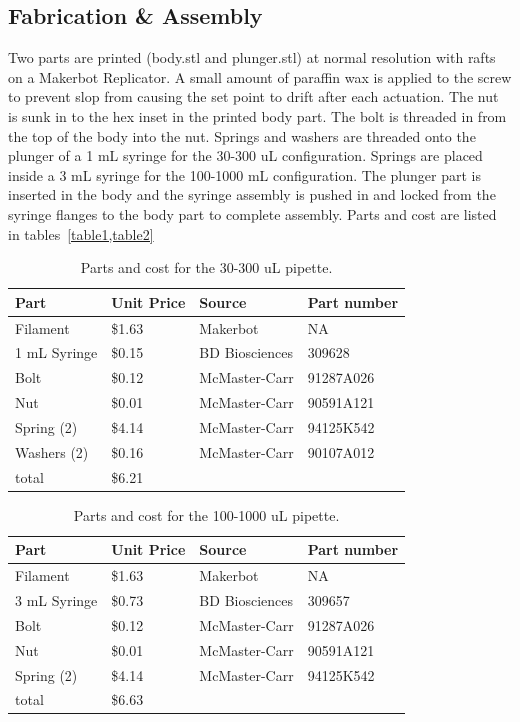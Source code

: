 \documentclass[10pt,letterpaper]{article}
\begin{document}
\subsection*{Fabrication & Assembly}
Two parts are printed (body.stl and plunger.stl) at normal resolution with rafts on a Makerbot Replicator.
A small amount of paraffin wax is applied to the screw to prevent slop from causing the set point to drift after each actuation.
The nut is sunk in to the hex inset in the printed body part.
The bolt is threaded in from the top of the body into the nut.
Springs and washers are threaded onto the plunger of a 1 mL syringe for the 30-300 uL configuration.
Springs are placed inside a 3 mL syringe for the 100-1000 mL configuration.
The plunger part is inserted in the body and the syringe assembly is pushed in and locked from the syringe flanges to the body part to complete assembly.
Parts and cost are listed in tables~\ref{table1,table2}

\begin{table}[!ht]
\centering
\caption{Parts and cost for the 30-300 uL pipette.}
\label{table1}
\begin{tabular}{|l|l|l|l|}
	\hline
	Part         & Unit Price & Source         & Part number \\ \hline
	Filament     & \$1.63     & Makerbot       & NA          \\ \hline
	1 mL Syringe & \$0.15     & BD Biosciences & 309628      \\ \hline
	Bolt         & \$0.12     & McMaster-Carr  & 91287A026   \\ \hline
	Nut          & \$0.01     & McMaster-Carr  & 90591A121   \\ \hline
	Spring (2)   & \$4.14     & McMaster-Carr  & 94125K542   \\ \hline
	Washers (2)  & \$0.16     & McMaster-Carr  & 90107A012   \\ \hline
	total        & \$6.21     &                &             \\ \hline
\end{tabular}
\end{table}

\begin{table}[!ht]
\centering
\caption{Parts and cost for the 100-1000 uL pipette.}
\label{table2}
\begin{tabular}{|l|l|l|l|}
	\hline
	Part         & Unit Price & Source         & Part number \\ \hline
	Filament     & \$1.63     & Makerbot       & NA          \\ \hline
	3 mL Syringe & \$0.73     & BD Biosciences & 309657      \\ \hline
	Bolt         & \$0.12     & McMaster-Carr  & 91287A026   \\ \hline
	Nut          & \$0.01     & McMaster-Carr  & 90591A121   \\ \hline
	Spring (2)   & \$4.14     & McMaster-Carr  & 94125K542   \\ \hline
	total        & \$6.63     &                &             \\ \hline
\end{tabular}
\end{table}
\end{document}
